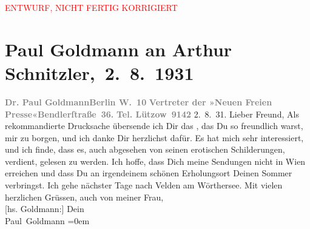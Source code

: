 
\begin{center}
            \textcolor{red}{ENTWURF, NICHT FERTIG KORRIGIERT}
                      \end{center}
            
         
         \renewcommand{\erwaehntePersonen}{Personen: Eva Marie Goldmann}
         \renewcommand{\erwaehnteInstitutionen}{Institutionen: Neue Freie Presse}
         \renewcommand{\erwaehnteOrte}{Orte: Bendlerstraße, Berlin, Velden am Wörthersee, Wien}
         \renewcommand{\erwaehnteWerke}{}
               \section[ Paul Goldmann an Arthur Schnitzler, 2. 8. 1931]{ Paul Goldmann an Arthur Schnitzler, 2. 8. 1931}\nopagebreak{}\rehead{ }\begin{ledgroupsized}[t]{13cm}\normalsize\beginnumbering \toendnotes[C]{\smallbreak\pagebreak[2]} 
\toendnotes[C]{\smallbreak}\pstart
           \noindent{}{\pb}\textcolor{gray}{\textbf{Dr. Paul Goldmann}}\hfill \textcolor{gray}{\textbf{Berlin W. 10}}\pend
           \pstart
           \textcolor{gray}{\textbf{Vertreter der »Neuen Freien
                           Presse«}}\hfill \textcolor{gray}{\textbf{Bendlerſtraße 36.}}\pend
           \pstart
           \raggedleft{}\textcolor{gray}{\textbf{Tel. Lützow 9142}}\pend
           \pstart
           \raggedleft{}2. 8. 31.\pend
           \pstart\center{}Lieber Freund,\pend\pstart
           Als rekommandierte Drucksache übersende ich Dir das \label{K_L03518-1v}\label{K_L03518-1h}, das Du so freundlich warst, mir zu borgen, und ich danke Dir herzlich\introOben{}st\introOben{} dafür. Es hat mich sehr interessiert, und ich finde, dass
               es, auch abgesehen von seinen erotischen Schilderungen, verdient, gelesen zu
               werden.\pend
           \pstart
           Ich hoffe, dass Dich meine Sendungen nicht in Wien
               erreichen und dass Du an irgendeinem schönen Erholungsort Deinen Sommer verbringst.
               Ich gehe nächster Tage nach Velden am
               Wörthersee.\pend
           \pstart
           Mit vielen herzlichen Grüssen, auch von meiner Frau, {\\[\baselineskip]}{[}hs. Goldmann:{]} Dein {\\[\baselineskip]}\spacefill\mbox{Paul Goldmann}\pend
           \leftskip=0em{}
         

\end{ledgroupsized}

